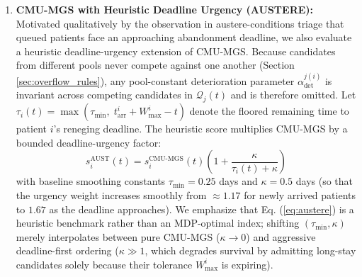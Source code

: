\documentclass[final,5p,times,twocolumn]{elsarticle}
\begin{document}
\begin{enumerate}
    \item \textbf{CMU-MGS with Heuristic Deadline Urgency (AUSTERE):}
    Motivated qualitatively by the observation in austere-conditions triage \cite{sun2018patient} that queued patients face an approaching abandonment deadline, we also evaluate a heuristic deadline-urgency extension of CMU-MGS. Because candidates from different pools never compete against one another (Section \ref{sec:overflow_rules}), any pool-constant deterioration parameter $\alpha_{\text{det}}^{j(i)}$ is invariant across competing candidates in $\mathcal{Q}_j(t)$ and is therefore omitted. Let $\tau_i(t) = \max\left(\tau_{\min},\; t_{\text{arr}}^i + W_{\max}^i - t\right)$ denote the floored remaining time to patient $i$'s reneging deadline. The heuristic score multiplies CMU-MGS by a bounded deadline-urgency factor:
    \begin{equation}
        s_i^{\text{AUST}}(t) = s_i^{\text{CMU-MGS}}(t) \left( 1 + \frac{\kappa}{\tau_i(t) + \kappa} \right)
        \label{eq:austere}
    \end{equation}
    with baseline smoothing constants $\tau_{\min} = 0.25$ days and $\kappa = 0.5$ days (so that the urgency weight increases smoothly from $\approx 1.17$ for newly arrived patients to $1.67$ as the deadline approaches). We emphasize that Eq. (\ref{eq:austere}) is a heuristic benchmark rather than an MDP-optimal index; shifting $(\tau_{\min}, \kappa)$ merely interpolates between pure CMU-MGS ($\kappa \to 0$) and aggressive deadline-first ordering ($\kappa \gg 1$, which degrades survival by admitting long-stay candidates solely because their tolerance $W_{\max}^i$ is expiring).
\end{enumerate}
\end{document}
